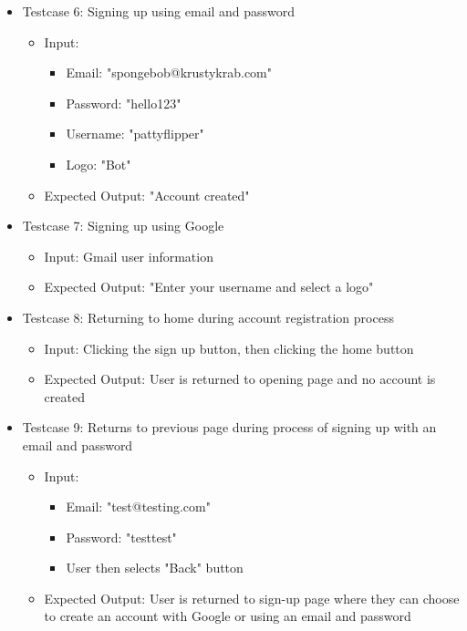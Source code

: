 \begin{itemize}
    \item Testcase 6: Signing up using email and password
    \begin{itemize}
        \item Input: 
            \begin{itemize}
                \item Email: "spongebob@krustykrab.com"
                \item Password: "hello123"
                \item Username: "pattyflipper"
                \item Logo: "Bot"
            \end{itemize}
        \item Expected Output: "Account created"
    \end{itemize}

    \item Testcase 7: Signing up using Google
    \begin{itemize}
        \item Input: Gmail user information
        \item Expected Output: "Enter your username and select a logo"
    \end{itemize}

    \item Testcase 8: Returning to home during account registration process
    \begin{itemize}
        \item Input: Clicking the sign up button, then clicking the home button
        \item Expected Output: User is returned to opening page and no account is created
    \end{itemize}

    \item Testcase 9: Returns to previous page during process of signing up with an email and password
    \begin{itemize}
        \item Input: 
            \begin{itemize}
                \item Email: "test@testing.com"
                \item Password: "testtest"
                \item User then selects "Back" button
            \end{itemize}
        \item Expected Output: User is returned to sign-up page where they can choose to create an account with Google or using an email and password
    \end{itemize}
\end{itemize}

